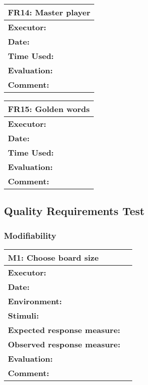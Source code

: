\begin{tabular}{|m{}||m{}|}
\hline
\multicolumn{2}{|l|}{FR14: Master player} \\ \hline
\textbf{Executor:} & \\ \hline
\textbf{Date:} & \\ \hline
\textbf{Time Used:} & \\ \hline
\textbf{Evaluation:} & \\ \hline
\textbf{Comment:} & \\ \hline
\end{tabular}

\begin{tabular}{|m{}||m{}|}
\hline
\multicolumn{2}{|l|}{FR15: Golden words} \\ \hline
\textbf{Executor:} & \\ \hline
\textbf{Date:} & \\ \hline
\textbf{Time Used:} & \\ \hline
\textbf{Evaluation:} & \\ \hline
\textbf{Comment:} & \\ \hline
\end{tabular}




\subsection{Quality Requirements Test}

\subsubsection{Modifiability}

\begin{tabular}{|m{}||m{}|}
\hline
\multicolumn{2}{|l|}{M1: Choose board size} \\ \hline
\textbf{Executor:} & \\ \hline
\textbf{Date:} & \\ \hline
\textbf{Environment:} & \\ \hline
\textbf{Stimuli:} & \\ \hline
\textbf{Expected response measure:} & \\ \hline
\textbf{Observed response measure:} & \\ \hline
\textbf{Evaluation:} & \\ \hline
\textbf{Comment:} & \\ \hline
\end{tabular}

